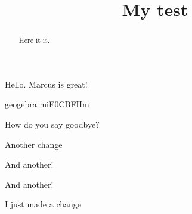 \documentclass{ximera}
\title{My test}
\newcommand{\geogebra}[1][]{geogebra #1}
\begin{document}
\begin{abstract}
  Here it is.
\end{abstract}
\maketitle

Hello. Marcus is great!





\geogebra{miE0CBFHm}

\begin{multipleChoice}
  How do you say goodbye?
\end{multipleChoice}

Another change

And another!

And another!

I just made a change
\end{document}
